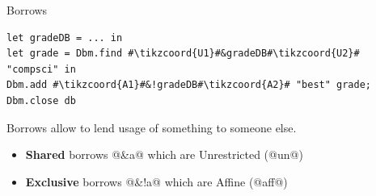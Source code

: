 \documentclass[aspectratio=169,dvipsnames,svgnames,10pt]{beamer}
\begin{document}
\begin{frame}[fragile]{Borrows}

\begin{verbatim}
let gradeDB = ... in
let grade = Dbm.find #\tikzcoord{U1}#&gradeDB#\tikzcoord{U2}# "compsci" in
Dbm.add #\tikzcoord{A1}#&!gradeDB#\tikzcoord{A2}# "best" grade;
Dbm.close db
\end{verbatim}
  
  Borrows allow to lend usage of something to someone else.
  \begin{itemize}
  \item \textbf{Shared} borrows @&a@ which are Unrestricted (@un@)
  \item \textbf{Exclusive} borrows @&!a@ which are Affine (@aff@)
  \end{itemize}

  
  
\end{frame}
\end{document}
